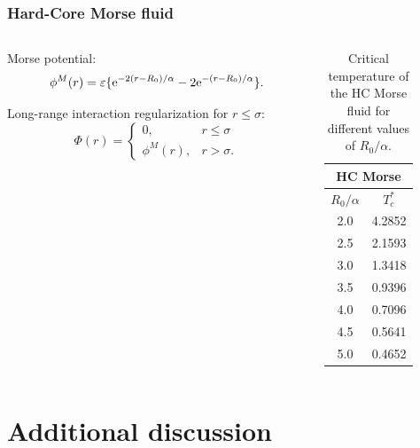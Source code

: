 \documentclass[8pt]{beamer}
\begin{document}
	\begin{frame}
		\frametitle{Hard-Core Morse fluid}
		
		\begin{columns}
			\begin{column}{0.5\textwidth}
				Morse potential:
				\begin{equation*}
					\phi^M(r) = \varepsilon \{{\rm e}^{-2(r-R_0)/\alpha}-2{\rm e}^{-(r-R_0)/\alpha}\}.
				\end{equation*}
				
				Long-range interaction regularization for $r \leq \sigma$:
				\begin{equation*}
					\Phi(r) = \left\{
					\begin{array}{ll}
						0, & r \leq \sigma 
						\\
						\phi^M(r), & r > \sigma.
					\end{array}
					\right.
				\end{equation*}
				
				
			\end{column}
			
			\begin{column}{0.5\textwidth}
				
				\begin{table}[h]
					\noindent\caption{Critical temperature of the HC Morse fluid for different values of $R_0/\alpha$.}\vskip3mm
					\begin{tabular}{|c|c|}
						\hline
						\multicolumn{2}{|c|}{HC Morse} \\
						\hline
						$R_0/\alpha$ \quad & $T_c^*$ \\
						\hline
						2.0  & 4.2852 \\
						2.5  & 2.1593 \\
						3.0  & 1.3418 \\
						3.5  & 0.9396 \\
						4.0  & 0.7096 \\
						4.5  & 0.5641 \\
						5.0  & 0.4652 \\
						\hline
					\end{tabular}
					\label{tab:morse_temp_cr}
				\end{table}
			\end{column}
		\end{columns}
		
	\end{frame}
	
	\section{Additional discussion}
	
\end{document}
